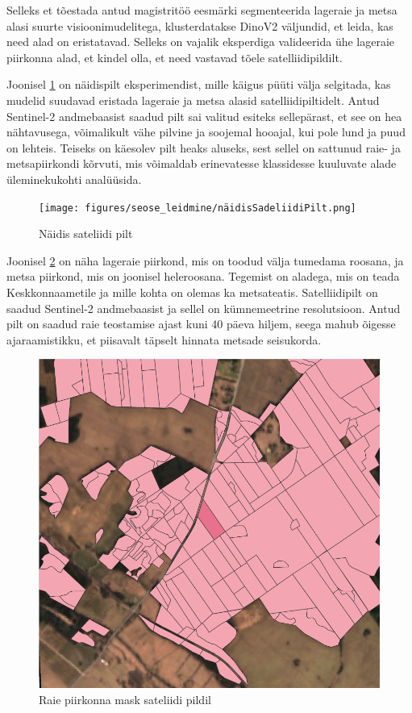 Selleks et tõestada antud magistritöö eesmärki segmenteerida lageraie ja metsa alasi suurte visioonimudelitega, klusterdatakse DinoV2 väljundid, et leida, kas need alad on eristatavad. Selleks on vajalik eksperdiga valideerida ühe lageraie piirkonna alad, et kindel olla, et need vastavad tõele satelliidipildilt.

Joonisel \ref{fig:näidisSadeliidiPilt} on näidispilt eksperimendist, mille käigus püüti välja selgitada, kas mudelid suudavad eristada lageraie ja metsa alasid satelliidipiltidelt. Antud Sentinel-2 andmebaasist saadud pilt sai valitud esiteks sellepärast, et see on hea nähtavusega, võimalikult vähe pilvine ja soojemal hooajal, kui pole lund ja puud on lehteis. Teiseks on käesolev pilt heaks aluseks, sest sellel on sattunud raie- ja metsapiirkondi kõrvuti, mis võimaldab erinevatesse klassidesse kuuluvate alade üleminekukohti analüüsida.

\begin{figure}[H]
    \centering
    \texttt{[image: figures/seose\_leidmine/näidisSadeliidiPilt.png]}
    \caption{Näidis sateliidi pilt}
    \label{fig:näidisSadeliidiPilt}
\end{figure}

Joonisel \ref{fig:raieInfoMask} on näha lageraie piirkond, mis on toodud välja tumedama roosana, ja metsa piirkond, mis on joonisel heleroosana. Tegemist on aladega, mis on teada Keskkonnaametile ja mille kohta on olemas ka metsateatis. Satelliidipilt on saadud Sentinel-2 andmebaasist ja sellel on kümnemeetrine resolutsioon. Antud pilt on saadud raie teostamise ajast kuni 40 päeva hiljem, seega mahub õigesse ajaraamistikku, et piisavalt täpselt hinnata metsade seisukorda.

\begin{figure}[H]
    \centering
    \includegraphics[width=.7\textwidth]{figures/seose_leidmine/raieInfoMask.png}
    \caption{Raie piirkonna mask sateliidi pildil}
    \label{fig:raieInfoMask}
\end{figure}

